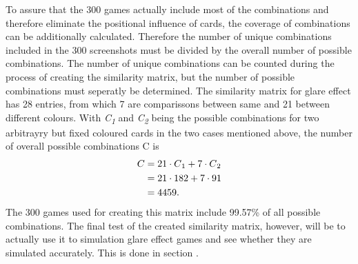 To assure that the 300 games actually include most of the combinations and therefore eliminate the positional influence of cards, the coverage of combinations can be additionally calculated. Therefore the number of unique combinations included in the 300 screenshots must be divided by the overall number of possible combinations. The number of unique combinations can be counted during the process of creating the similarity matrix, but the number of possible combinations must seperatly be determined. The similarity matrix for glare effect has 28 entries, from which 7 are comparissons between same and 21 between different colours. With \textit{C\textsubscript{1}} and \textit{C\textsubscript{2}}  being the possible combinations for two arbitrayry but fixed coloured cards in the two cases mentioned above, the number of overall possible combinations C is
\begin{align*}
	C &= 21 \cdot C\textsubscript{1} + 7 \cdot C\textsubscript{2}\\
	&= 21 \cdot 182 + 7 \cdot 91\\
	&= 4459. 
\end{align*}
The 300 games used for creating this matrix include 99.57\% of all possible combinations. The final test of the created similarity matrix, however, will be to actually use it to simulation glare effect games and see whether they are simulated accurately. This is done in section . 


